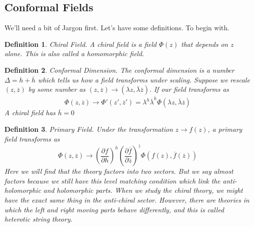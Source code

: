 \documentclass[11pt, oneside]{article}   	%
\theoremstyle{slanted}
\newtheorem*{defn}{Definition}
\begin{document}
\subsection{Conformal Fields}
We'll need a bit of Jargon first. 
Let's have some definitions. To begin with. 

\begin{defn}{Chiral Field.}
	A chiral field is a field $ \Phi \left(  z  \right)  $ that depends on 
	$ z $ alone. This is also called 
	a homomorphic field. 
\end{defn}
\begin{defn}{Conformal Dimension.}
	The conformal dimension is a number 
	$ \Delta  = h + \overline{ h } $  which 
	tells us how a field transforms under scaling. 
	Suppose we rescale $ \left( z, \overline{ z }  \right)  $ by some 
	number as $ \left( z, \overline{ z }  \right)  \to \left( 
	\lambda z ,  \overline{\lambda} \overline{ z } \right)  $. 
	If our field transforms as 
	\[
	 \Phi \left( z, \overline{ z }  \right)  \to 
	 \Phi  ' \left( z', \overline{ z }   '  \right)  = 
	 \lambda ^ h \overline{ \lambda } ^{ \overline{ h } } \Phi 
	 \left( \lambda z , \overline{ \lambda } \overline{  z  }  \right) 
 \] A chiral field has $ \overline{ h }  = 0  $
\end{defn}

\begin{defn}{Primary Field.}
	Under the transformation $ z \to f \left( z  \right)  $, 
	a primary field transforms as 
	\[
	 \Phi \left( z, \overline{ z }  \right)  \to 
	 \left( \frac{\partial  f }{\partial  h }   \right) ^{ h } 
	 \left( \frac{\partial  \overline{ f } }{\partial  \overline{ z } }   \right)  
	 ^{ \overline{ z }  } \Phi \left( f \left( z \right)  , 
	 \overline{ f } \left( \overline{ z }  \right)  \right) 
 \] Here we will find that 
 the theory factors into two sectors. But we say almost 
 factors because we still have this level matching condition 
 which link the anti-holomorphic and holomorphic parts. 
 When we study the chiral theory, we might have 
the exact same thing in the anti-chiral sector. 
However, there are theories in which the left and 
right moving parts behave differently, 
and this is called heterotic string theory. 	
\end{defn}
\end{document}
